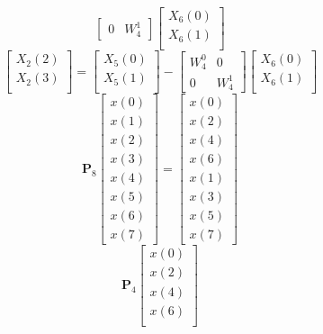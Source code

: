 \documentclass[journal,12pt,twocolumn]{IEEEtran}
\let\vec\mathbf
\numberwithin{equation}{section}
\renewcommand\thesection{\arabic{section}}
\renewcommand\thesection{\arabic{section}}
\begin{document}
\begin{enumerate}[label=\arabic*.,ref=\thesection.\theenumi]
\begin{equation}
\begin{bmatrix}
0 & W^{1}_{4}
\end{bmatrix}
\begin{bmatrix}
X_{6}(0) \\ 
X_{6}(1) \\ 
\end{bmatrix}
\end{equation}
\begin{equation}
\begin{bmatrix}
X_{2}(2) \\ 
X_{2}(3)\\ 
\end{bmatrix}
=
\begin{bmatrix}
X_{5}(0) \\ 
X_{5}(1)\\ 
\end{bmatrix}
-
\begin{bmatrix}
W^{0}_{4} & 0\\
0 & W^{1}_{4}
\end{bmatrix}
\begin{bmatrix}
X_{6}(0) \\ 
X_{6}(1) \\ 
\end{bmatrix}
\end{equation}
\begin{equation}
\vec{P}_{8}
\begin{bmatrix}
x(0) \\ 
x(1) \\ 
x(2) \\ 
x(3) \\ 
x(4) \\ 
x(5) \\
x(6) \\
x(7)
\end{bmatrix}
 = 
\begin{bmatrix}
x(0) \\ 
x(2) \\ 
x(4) \\ 
x(6) \\
x(1) \\ 
x(3) \\ 
x(5) \\
x(7)
\end{bmatrix}
\end{equation}
\begin{equation}
\vec{P}_{4}
\begin{bmatrix}
x(0) \\ 
x(2) \\ 
x(4) \\ 
x(6) \\

\end{bmatrix}
\end{equation}
\end{enumerate}
\end{document}
